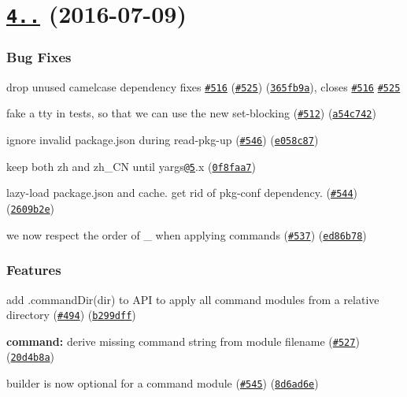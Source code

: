 \label{_4.8.0}%
 \section*{\href{https://github.com/yargs/yargs/compare/v4.7.1...v4.8.0}{\tt 4..} (2016-\/07-\/09)}

\subsubsection*{Bug Fixes}


\begin{DoxyItemize}
\item drop unused camelcase dependency fixes \href{https://github.com/yargs/yargs/issues/516}{\tt \#516} (\href{https://github.com/yargs/yargs/issues/525}{\tt \#525}) (\href{https://github.com/yargs/yargs/commit/365fb9a}{\tt 365fb9a}), closes \href{https://github.com/yargs/yargs/issues/516}{\tt \#516} \href{https://github.com/yargs/yargs/issues/525}{\tt \#525}
\item fake a tty in tests, so that we can use the new set-\/blocking (\href{https://github.com/yargs/yargs/issues/512}{\tt \#512}) (\href{https://github.com/yargs/yargs/commit/a54c742}{\tt a54c742})
\item ignore invalid package.\+json during read-\/pkg-\/up (\href{https://github.com/yargs/yargs/issues/546}{\tt \#546}) (\href{https://github.com/yargs/yargs/commit/e058c87}{\tt e058c87})
\item keep both zh and zh\+\_\+\+CN until yargs\href{https://github.com/5}{\tt @5}.x (\href{https://github.com/yargs/yargs/commit/0f8faa7}{\tt 0f8faa7})
\item lazy-\/load package.\+json and cache. get rid of pkg-\/conf dependency. (\href{https://github.com/yargs/yargs/issues/544}{\tt \#544}) (\href{https://github.com/yargs/yargs/commit/2609b2e}{\tt 2609b2e})
\item we now respect the order of \+\_\+ when applying commands (\href{https://github.com/yargs/yargs/issues/537}{\tt \#537}) (\href{https://github.com/yargs/yargs/commit/ed86b78}{\tt ed86b78})
\end{DoxyItemize}

\subsubsection*{Features}


\begin{DoxyItemize}
\item add .command\+Dir(dir) to A\+PI to apply all command modules from a relative directory (\href{https://github.com/yargs/yargs/issues/494}{\tt \#494}) (\href{https://github.com/yargs/yargs/commit/b299dff}{\tt b299dff})
\item {\bfseries command\+:} derive missing command string from module filename (\href{https://github.com/yargs/yargs/issues/527}{\tt \#527}) (\href{https://github.com/yargs/yargs/commit/20d4b8a}{\tt 20d4b8a})
\item builder is now optional for a command module (\href{https://github.com/yargs/yargs/issues/545}{\tt \#545}) (\href{https://github.com/yargs/yargs/commit/8d6ad6e}{\tt 8d6ad6e})
\end{DoxyItemize}

